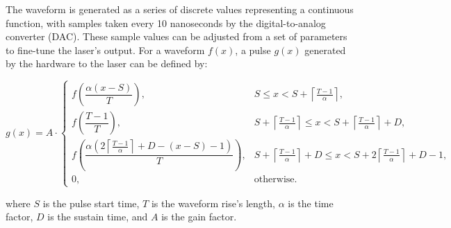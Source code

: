 The waveform is generated as a series of discrete values representing a continuous function, with samples taken every 10 nanoseconds by the digital-to-analog converter (DAC). These sample values can be adjusted from a set of parameters to fine-tune the laser's output. For a waveform $f(x)$, a pulse $g(x)$ generated by the hardware to the laser can be defined by:

\begin{equation}
g(x) = A \cdot 
\begin{cases} 
f\left(\dfrac{\alpha(x - S)}{T}\right), & \!\!\! S \leq x < S + \left\lceil \frac{T-1}{\alpha} \right\rceil, \\[8pt]
f\left(\dfrac{T-1}{T}\right), & \!\!\! S + \left\lceil \frac{T-1}{\alpha} \right\rceil \leq x < S + \left\lceil \frac{T-1}{\alpha} \right\rceil + D, \\[8pt]
f\left(\dfrac{\alpha\left(2\left\lceil \frac{T-1}{\alpha} \right\rceil + D - (x - S) - 1\right)}{T}\right), & \!\!\! S + \left\lceil \frac{T-1}{\alpha} \right\rceil + D \leq x < S + 2\left\lceil \frac{T-1}{\alpha} \right\rceil + D - 1, \\[8pt]
0, & \!\!\! \text{otherwise}.
\end{cases}
\end{equation}



where $S$ is the pulse start time, $T$ is the waveform rise's length, $\alpha$ is the time factor, $D$ is the sustain time, and $A$ is the gain factor.